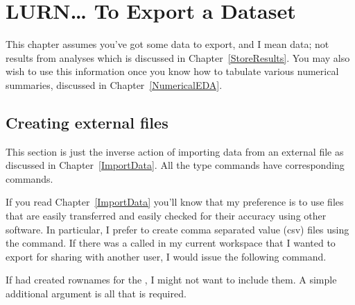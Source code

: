 \chapter{LURN\ldots{} To Export a Dataset} 
\label{ExportData} 
 

 
This chapter assumes you've got some data to export, and I mean data; not results from analyses which is discussed in Chapter~\ref{StoreResults}. You may also wish to use this information once you know how to tabulate various numerical summaries, discussed in Chapter~\ref{NumericalEDA}. 
 
\section{Creating external files} 
 
This section is just the inverse action of importing data from an external file as discussed in Chapter~\ref{ImportData}. All the  type commands have corresponding  commands. 
 
If you read Chapter~\ref{ImportData} you'll know that my preference is to use files that are easily transferred and easily checked for their accuracy using other software. In particular, I prefer to create comma separated value (csv) files using the  command. If there was a  called  in my current workspace that I wanted to export for sharing with another user, I would issue the following command. 
\begin{knitrout}
\color{fgcolor}\begin{kframe}
\begin{alltt}
 \hlstd{=}\hlstd{)}
\end{alltt}
\end{kframe}
\end{knitrout}
If \R{} had created rownames for the , I might not want to include them. A simple additional argument is all that is required. 
\begin{knitrout}
\color{fgcolor}\begin{kframe}
\begin{alltt}
 \hlstd{=}\hlstd{,} \hlstd{=}\hlstd{)}
\end{alltt}
\end{kframe}
\end{knitrout}
 
